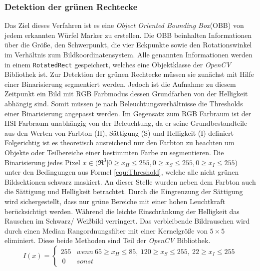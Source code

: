 \subsubsection{Detektion der grünen Rechtecke}
Das Ziel dieses Verfahren ist es eine \textit{Object Oriented Bounding Box}(OBB) von jedem erkannten Würfel Marker zu erstellen. Die OBB beinhalten Informationen über die Größe, den Schwerpunkt, die vier Eckpunkte sowie den Rotationswinkel im Verhältnis zum Bildkoordinatensystem. Alle genannten Informationen werden in einem \texttt{RotatedRect} gespeichert, welches eine Objektklasse der \textit{OpenCV} Bibliothek ist.
Zur Detektion der grünen Rechtecke müssen sie zunächst mit Hilfe einer Binarisierung segmentiert werden. Jedoch ist die Aufnahme zu diesem Zeitpunkt ein Bild mit RGB Farbmodus dessen Grundfarben von der Helligkeit abhängig sind. Somit müssen je nach Beleuchtungsverhältnisse die Thresholds einer Binarisierung angepasst werden. Im Gegensatz zum RGB Farbraum ist der HSI Farbraum unabhängig von der Beleuchtung, da er seine Grundbestandteile aus den Werten von Farbton (H), Sättigung (S) und Helligkeit (I) definiert Folgerichtig ist es theoretisch ausreichend nur den Farbton zu beachten um Objekte oder Teilbereiche einer bestimmten Farbe zu segmentieren.  
Die Binarisierung jedes Pixel $x \in (\Re^3 | 0 \ge x_H \le 255, 0 \ge x_S \le 255, 0 \ge x_I \le 255$) unter den Bedingungen aus Formel \ref{equ:Threshold}, welche alle nicht grünen Bildsektionen schwarz maskiert. An dieser Stelle wurden neben dem Farbton auch die Sättigung und Helligkeit betrachtet. Durch die Eingrenzung der Sättigung wird sichergestellt, dass nur grüne Bereiche mit einer hohen Leuchtkraft berücksichtigt werden. Während die leichte Einschränkung der Helligkeit das Rauschen im Schwarz/ Weißbild verringert. Das verbleibende Bildrauschen wird durch einen Median Rangordnungsfilter mit einer Kernelgröße von $5\times5$ eliminiert. Diese beide Methoden sind Teil der \textit{OpenCV} Bibliothek.
\begin{equation}
\label{equ:Threshold}
I(x) = \begin{cases}
255 & wenn \ 65 \ge x_H \le 85, \ 120 \ge x_S \le 255, \ 22 \ge x_I \le 255\\\
0 & sonst
\end{cases}
\end{equation}

